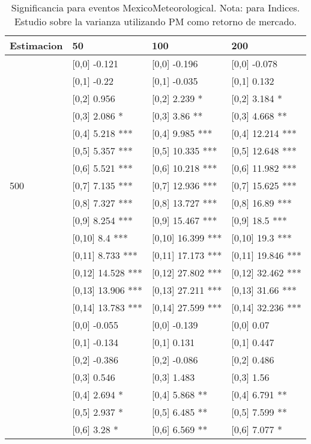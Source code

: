 \begin{table}

\caption{Significancia para eventos MexicoMeteorological. Nota: para Indices. Estudio sobre la varianza utilizando PM como retorno de mercado.}
\centering
\begin{tabular}[t]{llll}
\toprule
Estimacion & 50 & 100 & 200\\
\midrule
 & {}[0,0] -0.121 & {}[0,0] -0.196 & {}[0,0] -0.078\\
 & {}[0,1] -0.22 & {}[0,1] -0.035 & {}[0,1] 0.132\\
 & {}[0,2] 0.956 & {}[0,2] 2.239 * & {}[0,2] 3.184 *\\
 & {}[0,3] 2.086 * & {}[0,3] 3.86 ** & {}[0,3] 4.668 **\\
 & {}[0,4] 5.218 *** & {}[0,4] 9.985 *** & {}[0,4] 12.214 ***\\
\addlinespace
 & {}[0,5] 5.357 *** & {}[0,5] 10.335 *** & {}[0,5] 12.648 ***\\
 & {}[0,6] 5.521 *** & {}[0,6] 10.218 *** & {}[0,6] 11.982 ***\\
500 & {}[0,7] 7.135 *** & {}[0,7] 12.936 *** & {}[0,7] 15.625 ***\\
 & {}[0,8] 7.327 *** & {}[0,8] 13.727 *** & {}[0,8] 16.89 ***\\
 & {}[0,9] 8.254 *** & {}[0,9] 15.467 *** & {}[0,9] 18.5 ***\\
\addlinespace
 & {}[0,10] 8.4 *** & {}[0,10] 16.399 *** & {}[0,10] 19.3 ***\\
 & {}[0,11] 8.733 *** & {}[0,11] 17.173 *** & {}[0,11] 19.846 ***\\
 & {}[0,12] 14.528 *** & {}[0,12] 27.802 *** & {}[0,12] 32.462 ***\\
 & {}[0,13] 13.906 *** & {}[0,13] 27.211 *** & {}[0,13] 31.66 ***\\
 & {}[0,14] 13.783 *** & {}[0,14] 27.599 *** & {}[0,14] 32.236 ***\\
\addlinespace
 & {}[0,0] -0.055 & {}[0,0] -0.139 & {}[0,0] 0.07\\
 & {}[0,1] -0.134 & {}[0,1] 0.131 & {}[0,1] 0.447\\
 & {}[0,2] -0.386 & {}[0,2] -0.086 & {}[0,2] 0.486\\
 & {}[0,3] 0.546 & {}[0,3] 1.483 & {}[0,3] 1.56\\
 & {}[0,4] 2.694 * & {}[0,4] 5.868 ** & {}[0,4] 6.791 **\\
\addlinespace
 & {}[0,5] 2.937 * & {}[0,5] 6.485 ** & {}[0,5] 7.599 **\\
 & {}[0,6] 3.28 * & {}[0,6] 6.569 ** & {}[0,6] 7.077 *\\

\end{tabular}
\end{table}
